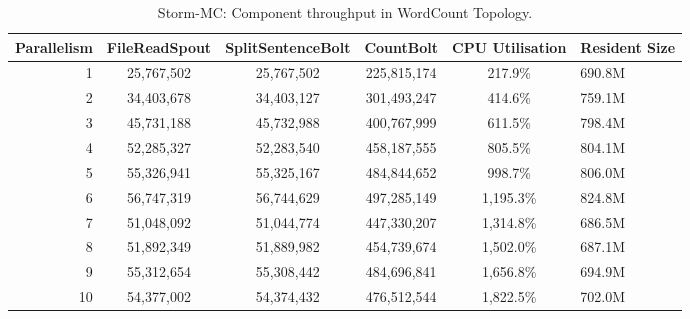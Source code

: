 \begin{table}[!htb]
\begin{adjustwidth}{-0.5in}{-0.5in}
\centering
\small
\begin{tabular}{@{}rccccl@{}}
    \textbf{Parallelism} & \textbf{FileReadSpout} & \textbf{SplitSentenceBolt} & \textbf{CountBolt} & \textbf{CPU Utilisation} & \textbf{Resident Size} \\ \toprule
    1 & {25,767,502} & {25,767,502} & {225,815,174} & {217.9\%} & {690.8M} \\
    2 & {34,403,678} & {34,403,127} & {301,493,247} & {414.6\%} & {759.1M} \\
    3 & {45,731,188} & {45,732,988} & {400,767,999} & {611.5\%} & {798.4M} \\
    4 & {52,285,327} & {52,283,540} & {458,187,555} & {805.5\%} & {804.1M} \\
	5 & {55,326,941} & {55,325,167} & {484,844,652} & {998.7\%} & {806.0M} \\
	6 & {56,747,319} & {56,744,629} & {497,285,149} & {1,195.3\%} & {824.8M} \\
	7 & {51,048,092} & {51,044,774} & {447,330,207} & {1,314.8\%} & {686.5M} \\
	8 & {51,892,349} & {51,889,982} & {454,739,674} & {1,502.0\%} & {687.1M} \\
	9 & {55,312,654} & {55,308,442} & {484,696,841} & {1,656.8\%} & {694.9M} \\
	10 & {54,377,002} & {54,374,432} & {476,512,544} & {1,822.5\%} & {702.0M} \\
\end{tabular}
\caption{Storm-MC: Component throughput in WordCount Topology.}
\label{table:storm_mc_wordcount}
\end{adjustwidth}
\end{table}

